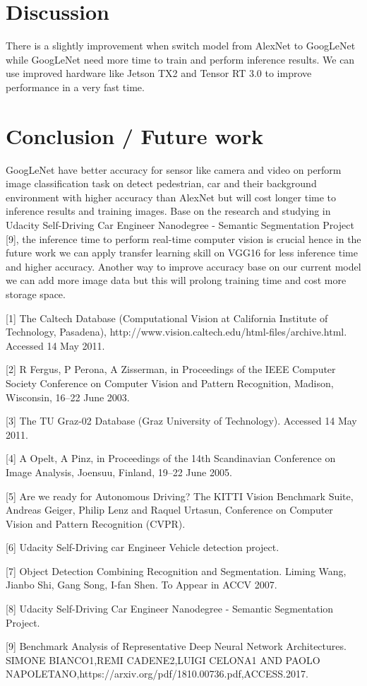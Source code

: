 \documentclass[10pt,journal,compsoc]{IEEEtran}
\begin{document}
\section{Discussion}
There is a slightly improvement when switch model from AlexNet to GoogLeNet while GoogLeNet need more time to train and perform inference results. We can use improved hardware like Jetson TX2 and Tensor RT 3.0 to improve performance in a very fast time.

\section{Conclusion / Future work}
GoogLeNet have better accuracy for sensor like camera and video on perform image classification task on detect pedestrian, car and their background environment with higher accuracy than AlexNet but will cost longer time to inference results and training images. Base on the research and studying in Udacity Self-Driving Car Engineer Nanodegree - Semantic Segmentation Project [9], the inference time to perform real-time computer vision is crucial hence in the future work we can apply transfer learning skill on VGG16 for less inference time and higher accuracy. Another way to improve accuracy base on our current model we can add more image data but this will prolong training time and cost more storage space.




[1] The Caltech Database (Computational Vision at California Institute of Technology, Pasadena), http://www.vision.caltech.edu/html-files/archive.html. Accessed 14 May 2011.

[2] R Fergus, P Perona, A Zisserman, in Proceedings of the IEEE Computer Society Conference on Computer Vision and Pattern Recognition, Madison, Wisconsin, 16–22 June 2003.

[3] The TU Graz-02 Database (Graz University of Technology). Accessed 14 May 2011. 

[4] A Opelt, A Pinz, in Proceedings of the 14th Scandinavian Conference on Image Analysis, Joensuu, Finland, 19–22 June 2005.

[5] Are we ready for Autonomous Driving? The KITTI Vision Benchmark Suite, Andreas Geiger, Philip Lenz and Raquel Urtasun, Conference on Computer Vision and Pattern	Recognition (CVPR).

[6] Udacity Self-Driving car Engineer Vehicle detection project.

[7] Object Detection Combining Recognition and Segmentation. Liming Wang, Jianbo Shi, Gang Song, I-fan Shen. To Appear in ACCV 2007.

[8] Udacity Self-Driving Car Engineer Nanodegree - Semantic Segmentation Project.

[9] Benchmark Analysis of Representative Deep Neural Network Architectures. SIMONE BIANCO1,REMI CADENE2,LUIGI CELONA1 AND PAOLO NAPOLETANO,https://arxiv.org/pdf/1810.00736.pdf,ACCESS.2017.
\end{document}
